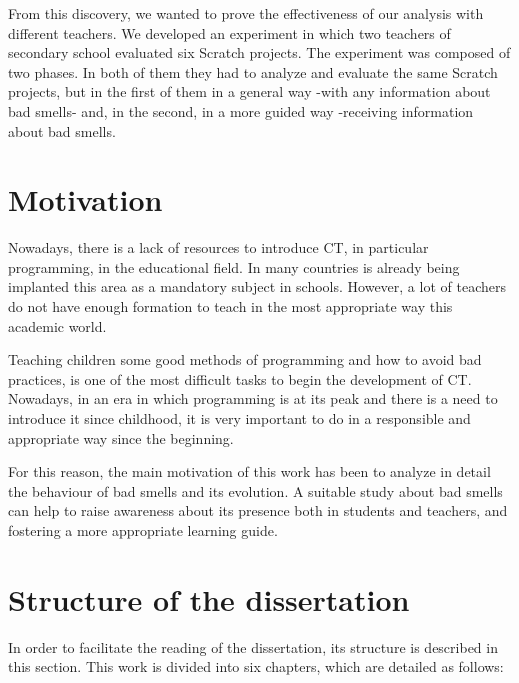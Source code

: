 From this discovery, we wanted to prove the effectiveness of our analysis with different teachers. We developed an experiment in which two teachers of secondary school evaluated six Scratch projects. The experiment was composed of two phases. In both of them they had to analyze and evaluate the same Scratch projects, but in the first of them in a general way -with any information about bad smells- and, in the second, in a more guided way -receiving information about bad smells. 


\section{Motivation}
\label{sec:motivation}

Nowadays, there is a lack of resources to introduce CT, in particular programming, in the educational field. In many countries is already being implanted this area as a mandatory subject in schools. However, a lot of teachers do not have enough formation to teach in the most appropriate way this academic world. 

Teaching children some good methods of programming and how to avoid bad practices, is one of the most difficult tasks to begin the development of CT. Nowadays, in an era in which programming is at its peak and there is a need to introduce it since childhood, it is very important to do in a responsible and appropriate way since the beginning. 

For this reason, the main motivation of this work has been to analyze in detail the behaviour of bad smells and its evolution. A suitable study about bad smells can help to raise awareness about its presence both in students and teachers, and fostering a more appropriate learning guide.


\section{Structure of the dissertation}
\label{sec:structure}

In order to facilitate the reading of the dissertation, its structure is described in this section. This work is divided into six chapters, which are detailed as follows:

